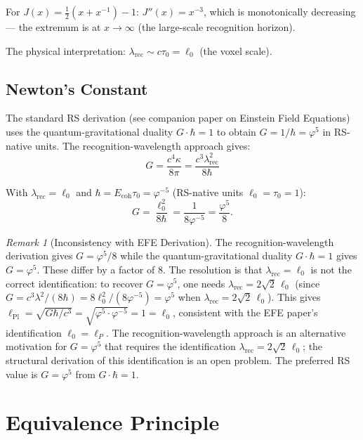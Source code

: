 \documentclass[12pt,a4paper]{article}
\theoremstyle{definition}
\theoremstyle{remark}
\newtheorem{remark}[theorem]{Remark}
\begin{document}
For $J(x) = \frac{1}{2}(x + x^{-1}) - 1$: $J''(x) = x^{-3}$, which is monotonically 
decreasing — the extremum is at $x \to \infty$ (the large-scale recognition horizon).

The physical interpretation: $\lambda_\mathrm{rec} \sim c\tau_0 = \ell_0$ (the voxel scale).

\subsection{Newton's Constant}

The standard RS derivation (see companion paper on Einstein Field Equations) uses
the quantum-gravitational duality $G\cdot\hbar = 1$ to obtain $G = 1/\hbar = \varphi^5$
in RS-native units.  The recognition-wavelength approach gives:
\begin{equation}
G = \frac{c^4\kappa}{8\pi} = \frac{c^3\lambda_\mathrm{rec}^2}{8\hbar}
\end{equation}

With $\lambda_\mathrm{rec} = \ell_0$ and $\hbar = E_\mathrm{coh}\tau_0 = \varphi^{-5}$ (RS-native
units $\ell_0 = \tau_0 = 1$):
\begin{equation}
G = \frac{\ell_0^2}{8\hbar} = \frac{1}{8\varphi^{-5}} = \frac{\varphi^5}{8}.
\end{equation}

\begin{remark}[Inconsistency with EFE Derivation]
The recognition-wavelength derivation gives $G = \varphi^5/8$ while the
quantum-gravitational duality $G\cdot\hbar = 1$ gives $G = \varphi^5$.
These differ by a factor of 8.  The resolution is that $\lambda_\mathrm{rec} = \ell_0$
is not the correct identification: to recover $G = \varphi^5$, one needs
$\lambda_\mathrm{rec} = 2\sqrt{2}\,\ell_0$ (since $G = c^3\lambda^2/(8\hbar)
= 8\ell_0^2/(8\varphi^{-5}) = \varphi^5$ when $\lambda_\mathrm{rec} = 2\sqrt{2}\,\ell_0$).
This gives $\ell_\mathrm{Pl} = \sqrt{G\hbar/c^3} = \sqrt{\varphi^5\cdot\varphi^{-5}} = 1 = \ell_0$,
consistent with the EFE paper's identification $\ell_0 = \ell_P$.  The recognition-wavelength
approach is an alternative motivation for $G = \varphi^5$ that requires the identification
$\lambda_\mathrm{rec} = 2\sqrt{2}\,\ell_0$; the structural derivation of this identification
is an open problem.  The preferred RS value is $G = \varphi^5$ from $G\cdot\hbar = 1$.
\end{remark}

\section{Equivalence Principle}
\label{sec:ep}
\end{document}
